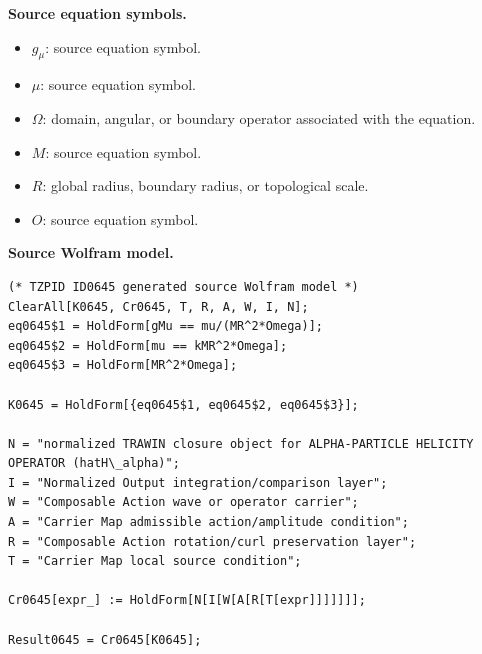 \begin{minipage}[t]{0.49\linewidth}
\begingroup
\small
\raggedright
\textbf{Source equation symbols.}\par
\begin{itemize}[leftmargin=1.35em,itemsep=1pt,topsep=1pt,parsep=0pt]
    \item $g_{\mu}$: source equation symbol.
    \item $\mu$: source equation symbol.
    \item $\Omega$: domain, angular, or boundary operator associated with the equation.
    \item $M$: source equation symbol.
    \item $R$: global radius, boundary radius, or topological scale.
    \item $O$: source equation symbol.
\end{itemize}
\endgroup
\end{minipage}\hfill
\begin{minipage}[t]{0.47\linewidth}
\begingroup
\scriptsize
\raggedright
\textbf{Source Wolfram model.}\par
\begin{Verbatim}[fontsize=\tiny,breaklines=true,breakanywhere=true]
(* TZPID ID0645 generated source Wolfram model *)
ClearAll[K0645, Cr0645, T, R, A, W, I, N];
eq0645$1 = HoldForm[gMu == mu/(MR^2*Omega)];
eq0645$2 = HoldForm[mu == kMR^2*Omega];
eq0645$3 = HoldForm[MR^2*Omega];

K0645 = HoldForm[{eq0645$1, eq0645$2, eq0645$3}];

N = "normalized TRAWIN closure object for ALPHA-PARTICLE HELICITY OPERATOR (hatH\_alpha)";
I = "Normalized Output integration/comparison layer";
W = "Composable Action wave or operator carrier";
A = "Carrier Map admissible action/amplitude condition";
R = "Composable Action rotation/curl preservation layer";
T = "Carrier Map local source condition";

Cr0645[expr_] := HoldForm[N[I[W[A[R[T[expr]]]]]]];

Result0645 = Cr0645[K0645];
\end{Verbatim}
\endgroup
\end{minipage}

